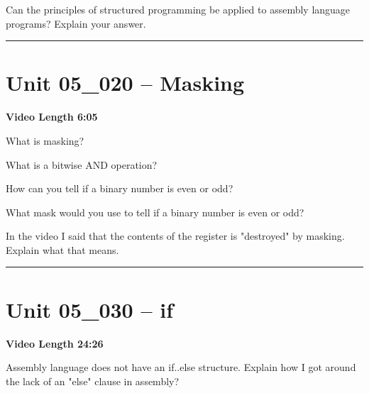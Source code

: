 \documentclass[letterpaper,12pt]{exam}
\newcommand{\unit}{Unit 05}
\begin{document}
\begin{questions}
\begin{samepage}
    \question Can the principles of structured programming be applied to assembly language programs? Explain your answer.
    \vspace{5mm}
\end{samepage}
\par
 
\rule{0.5\textwidth}{.4pt} %
\section*{\unit\_020 -- Masking}
\par{\selectfont\textbf{Video Length 6:05}}
\begin{samepage}
    \question What is masking?
    \vspace{5mm}
\end{samepage}
\par
\begin{samepage}
    \question What is a bitwise AND operation?
    \vspace{5mm}
\end{samepage}
\begin{samepage}
    \question How can you tell if a binary number is even or odd?
    \vspace{5mm}
\end{samepage}
\par
\begin{samepage}
    \question What mask would you use to tell if a binary number is even or odd?
    \vspace{5mm}
\end{samepage}
\par
\begin{samepage}
    \question In the video I said that the contents of the register is "destroyed" by masking.  Explain what that means.
    \vspace{5mm}
\end{samepage}
\par

\rule{0.5\textwidth}{.4pt} %
\section*{\unit\_030 -- if}
\par{\selectfont\textbf{Video Length 24:26}}
\begin{samepage}
    \question Assembly language does not have an if..else structure.  Explain how I got around the lack of an "else" clause in assembly?
    \vspace{5mm}
\end{samepage}
\par


\end{questions}
\end{document}
